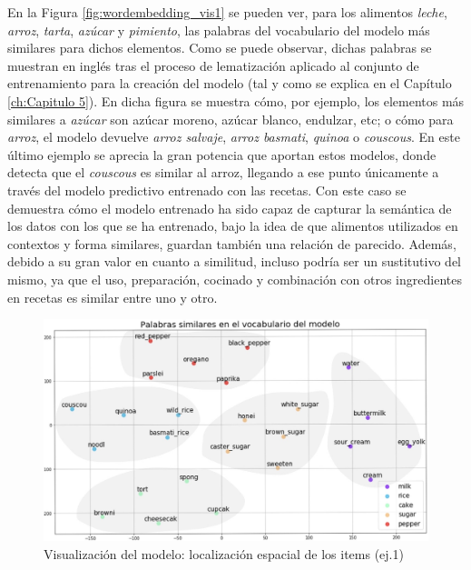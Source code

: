 En la Figura \ref{fig:wordembedding_vis1} se pueden ver, para los alimentos \textit{leche}, \textit{arroz}, \textit{tarta}, \textit{azúcar} y \textit{pimiento}, las palabras del vocabulario del modelo más similares para dichos elementos. Como se puede observar, dichas palabras se muestran en inglés tras el proceso de lematización aplicado al conjunto de entrenamiento para la creación del modelo (tal y como se explica en el Capítulo \ref{ch:Capitulo 5}). En dicha figura se muestra cómo, por ejemplo, los elementos más similares a \textit{azúcar} son azúcar moreno, azúcar blanco, endulzar, etc; o cómo para \textit{arroz}, el modelo devuelve \textit{arroz salvaje}, \textit{arroz basmati}, \textit{quinoa} o \textit{couscous}. En este último ejemplo se aprecia la gran potencia que aportan estos modelos, donde detecta que el \textit{couscous} es similar al arroz, llegando a ese punto únicamente a través del modelo predictivo entrenado con las recetas. Con este caso se demuestra cómo el modelo entrenado ha sido capaz de capturar la semántica de los datos con los que se ha entrenado, bajo la idea de que alimentos utilizados en contextos y forma similares, guardan también una relación de parecido. Además, debido a su gran valor en cuanto a similitud, incluso podría ser un sustitutivo del mismo, ya que el uso, preparación, cocinado y combinación con otros ingredientes en recetas es similar entre uno y otro. 

\begin{figure}[H]
    \centering
    \includegraphics[width=1.0\textwidth]{imagenes/resultados/word-embedding-3.jpg}
    \caption{Visualización del modelo: localización espacial de los items (ej.1)}
    \label{fig:wordembedding_vis2}
\end{figure}


